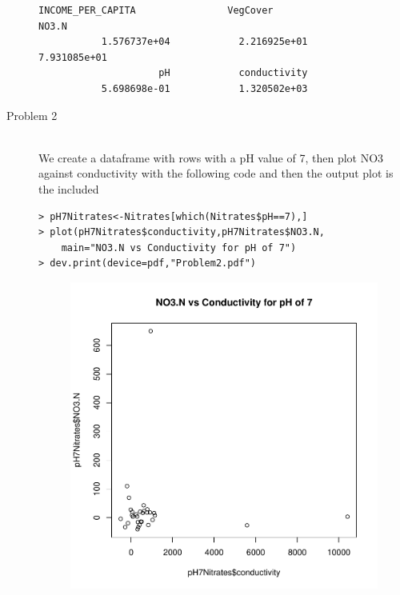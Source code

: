 \documentclass[10pt]{article}
\begin{document}
\begin{description}
\begin{lstlisting}[frame=trBL]
      INCOME_PER_CAPITA                VegCover                   NO3.N 
           1.576737e+04            2.216925e+01            7.931085e+01 
                     pH            conductivity 
           5.698698e-01            1.320502e+03 
\end{lstlisting}
\item[Problem 2]\hfill\\
We create a dataframe with rows with a pH value of 7, then plot NO3 against conductivity with the following code and then the output plot is the included
\begin{lstlisting}[frame=trBL]
> pH7Nitrates<-Nitrates[which(Nitrates$pH==7),]
> plot(pH7Nitrates$conductivity,pH7Nitrates$NO3.N,
	main="NO3.N vs Conductivity for pH of 7")
> dev.print(device=pdf,"Problem2.pdf")
\end{lstlisting}
\begin{figure}[h]
{\centering
\includegraphics[width=15cm]{../Problem2.pdf}}
\end{figure}
 

\end{description}
\end{document}
